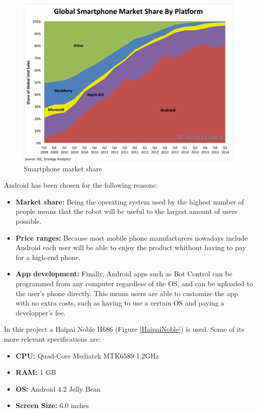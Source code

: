 	\begin{figure}[H]
			\centering
			\includegraphics[width=15cm]{images/ProjectComponents/smartphone-market-share.png}
			\caption{Smartphone market share}
			\label{marketshare}
	\end{figure}
	\bigskip


Android has been chosen for the following reasons:
	\begin{itemize}
	\item \textbf{Market share:} Being the operating system used by the highest number of people means that the robot will be useful to the largest amount of users possible.
	\item \textbf{Price ranges:} Because most mobile phone manufacturers nowadays include Android each user will be able to enjoy the product whithout having to pay for a high-end phone.
	\item \textbf{App development:} Finally, Android apps such as Bot Control can be programmed from any computer regardless of the OS, and can be uploaded to the user's phone directly. This means users are able to customize the app with no extra costs, such as having to use a certain OS and paying a developper's fee.
	\end{itemize}


\newpage
In this project a Haipai Noble H686 (Figure \ref{HaipaiNoble}) is used. Some of its more relevant specifications are:
	\begin{itemize}
	\item \textbf{CPU:} Quad-Core Mediatek MTK6589 1.2GHz
	\item \textbf{RAM:} 1 GB
	\item \textbf{OS:} Android 4.2 Jelly Bean
	\item \textbf{Screen Size:} 6.0 inches
	\end{itemize}

